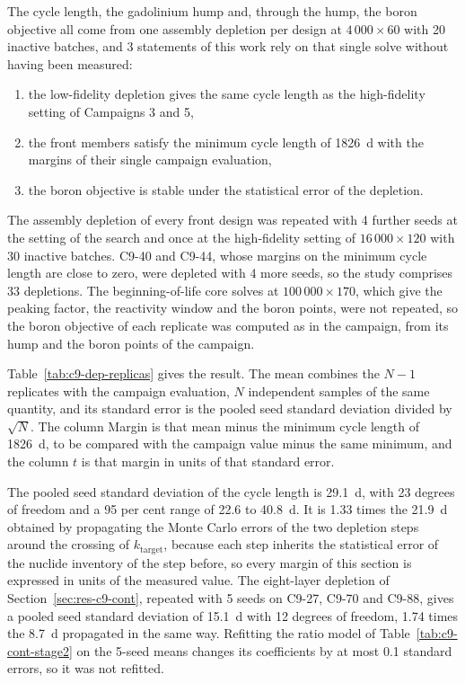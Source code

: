 The cycle length, the gadolinium hump and, through the hump, the boron
objective all come from one assembly depletion per design at
$4\,000\times60$ with 20 inactive batches, and 3 statements of this
work rely on that single solve without having been measured:
\begin{enumerate}
  \item the low-fidelity depletion gives the same cycle length as the
        high-fidelity setting of Campaigns 3 and 5,
  \item the front members satisfy the minimum cycle length of
        \SI{1826}{d} with the margins of their single campaign evaluation,
  \item the boron objective is stable under the statistical error of
        the depletion.
\end{enumerate}

The assembly depletion of every front design was repeated with 4
further seeds at the setting of the search and once at the
high-fidelity setting of $16\,000\times120$ with 30 inactive batches.
C9-40 and C9-44, whose margins on the minimum cycle length are close
to zero, were depleted with 4 more seeds, so the study comprises 33
depletions. The beginning-of-life core solves at $100\,000\times170$,
which give the peaking factor, the reactivity window and the boron
points, were not repeated, so the boron objective of each replicate
was computed as in the campaign, from its hump and the boron points of
the campaign.

Table~\ref{tab:c9-dep-replicas} gives the result. The mean combines
the $N-1$ replicates with the campaign evaluation, $N$ independent samples
of the same quantity, and its standard error is the pooled seed standard
deviation divided by $\sqrt{N}$. The column Margin is that mean minus the
minimum cycle length of \SI{1826}{d}, to be compared with the campaign
value minus the same minimum, and the column $t$ is that margin in units
of that standard error.

\label{sec:res-c9-dep-error}%
The pooled seed standard deviation of the cycle length is \SI{29.1}{d},
with 23 degrees of freedom and a 95 per cent range of 22.6 to
\SI{40.8}{d}. It is 1.33 times the \SI{21.9}{d} obtained by propagating
the Monte Carlo errors of the two depletion steps around the crossing
of $k_\mathrm{target}$, because each step inherits the statistical error
of the nuclide inventory of the step before, so every margin of this
section is expressed in units of the measured value. The eight-layer
depletion of Section~\ref{sec:res-c9-cont}, repeated with 5 seeds on
C9-27, C9-70 and C9-88, gives a pooled seed standard deviation of
\SI{15.1}{d} with 12 degrees of freedom, 1.74 times the \SI{8.7}{d}
propagated in the same way. Refitting the ratio model of
Table~\ref{tab:c9-cont-stage2} on the 5-seed means changes its
coefficients by at most 0.1 standard errors, so it was not refitted.

